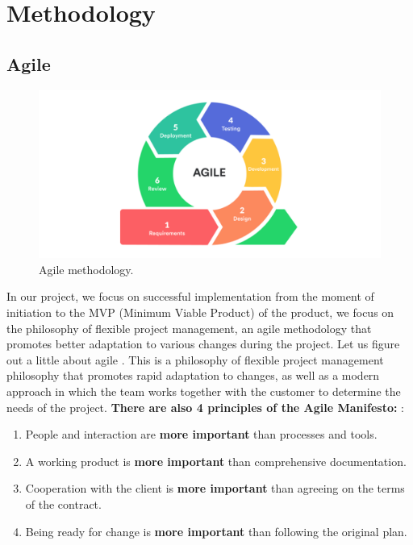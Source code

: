 \chapter{Methodology}\label{ch:B}
\section{Agile}\label{agile}
\begin{figure}[ht]\label{fig:agile}
  \centering
  \includegraphics[width=0.8\linewidth]{figures/agile.png}
  \caption{Agile methodology.}
\end{figure}
\vspace{0.5cm}

\hspace*{1cm} In our project, we focus on successful implementation from the moment of initiation to the MVP (Minimum Viable Product) \cite{mvp} of the product, we focus on the philosophy of flexible project management, an agile methodology \cite{agile} that promotes better adaptation to various changes during the project. 
Let us figure out a little about agile \cite{agile}. This is a philosophy of flexible project management philosophy that promotes rapid adaptation to changes, as well as a modern approach in which the team works together with the customer to determine the needs of the project. \textbf{There are also 4 principles of the Agile Manifesto:} \cite{agilemanifesto}:

\begin{enumerate}
\item People and interaction are \textbf{more important} than processes and tools.
\item A working product is \textbf{more important} than comprehensive documentation.
\item Cooperation with the client is \textbf{more important} than agreeing on the terms of the contract.
\item Being ready for change is \textbf{more important} than following the original plan. 
\end{enumerate}

